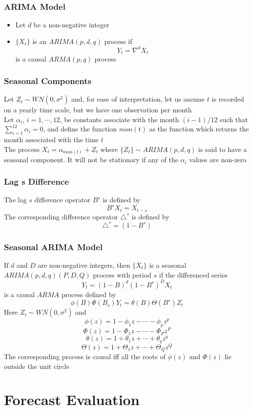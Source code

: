 \documentclass[11pt]{article}
\newcommand{\tri}{\triangle}
\begin{document}
\subsubsection{ARIMA Model}
\begin{itemize}
    \item Let $d$ be a non-negative integer
    \item $\{X_t\}$ is an $ARIMA(p,d,q)$ process if \[Y_t=\nabla^dX_t\] is a causal $ARMA(p,q)$ process 
\end{itemize}
\subsubsection{Seasonal Components}
Let $Z_t\sim WN(0,\sigma^2)$ and, for ease of interpretation, let us assume $t$ is recorded on a yearly time scale, but we have one observation per month \\
Let $\alpha_i$, $i=1,\cdots,12$, be constants associate with the month $(i-1)/12$ such that $\sum_{i=1}^{12}\alpha_i=0$, and define the function $mon(t)$ as the function which 
returns the month associated with the time $t$ \\
The process $X_t=\alpha_{mon(t)}+Z_t$ where $\{Z_t\}\sim ARIMA(p,d,q)$ is said to have a seasonal component. It will not be stationary if any of the $\alpha_i$ values are non-zero
\subsubsection{Lag s Difference}
The lag $s$ difference operator $B^s$ is defined by \[B^sX_t = X_{t-s}\]    
The corresponding difference operator $\tri^s$ is defined by \[\tri^s = (1-B^s)\]
\subsubsection{Seasonal ARIMA Model}
If $d$ and $D$ are non-negative integers, then $\{X_t\}$ is a seasonal $ARIMA(p,d,q)(P,D,Q)$ process with period $s$ if the differenced series 
\[Y_t=(1-B)^d(1-B^s)^DX_t\] is a causal $ARMA$ process defined by 
\[\phi(B)\Phi(B_s)Y_t = \theta(B)\Theta(B^s)Z_t\]
Here $Z_t\sim WN(0,\sigma^2)$ and 
\[\phi(z) = 1-\phi_1z - \cdots - \phi_pz^p\] \[\Phi(z) = 1-\Phi_1z - \cdots - \Phi_Pz^P\]
\[\theta(z) = 1+\theta_1z + \cdots + \theta_qz^q\]
\[\Theta(z) = 1+\Theta_1z + \cdots + \Theta_Qz^Q\]
The corresponding process is causal iff all the roots of $\phi(z)$ and $\Phi(z)$ lie outside the unit circle     
\newpage 

\section{Forecast Evaluation}
\end{document}
